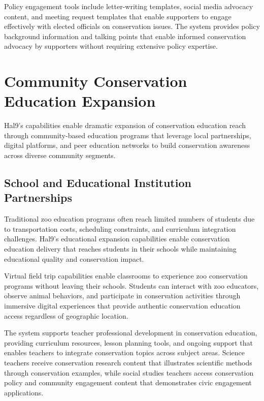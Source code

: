 \documentclass[
  Letterpaper,
]{scrbook}
\begin{document}
Policy engagement tools include letter-writing templates, social media
advocacy content, and meeting request templates that enable supporters
to engage effectively with elected officials on conservation issues. The
system provides policy background information and talking points that
enable informed conservation advocacy by supporters without requiring
extensive policy expertise.

\section{Community Conservation Education
Expansion}\label{community-conservation-education-expansion}

Hal9's capabilities enable dramatic expansion of conservation education
reach through community-based education programs that leverage local
partnerships, digital platforms, and peer education networks to build
conservation awareness across diverse community segments.

\subsection{School and Educational Institution
Partnerships}\label{school-and-educational-institution-partnerships}

Traditional zoo education programs often reach limited numbers of
students due to transportation costs, scheduling constraints, and
curriculum integration challenges. Hal9's educational expansion
capabilities enable conservation education delivery that reaches
students in their schools while maintaining educational quality and
conservation impact.

Virtual field trip capabilities enable classrooms to experience zoo
conservation programs without leaving their schools. Students can
interact with zoo educators, observe animal behaviors, and participate
in conservation activities through immersive digital experiences that
provide authentic conservation education access regardless of geographic
location.

The system supports teacher professional development in conservation
education, providing curriculum resources, lesson planning tools, and
ongoing support that enables teachers to integrate conservation topics
across subject areas. Science teachers receive conservation research
content that illustrates scientific methods through conservation
examples, while social studies teachers access conservation policy and
community engagement content that demonstrates civic engagement
applications.
\end{document}
